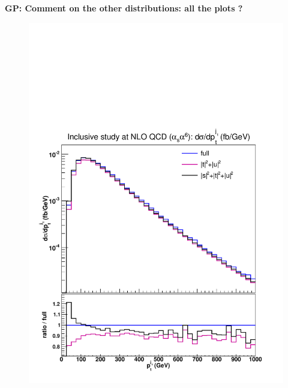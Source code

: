 {\bf GP: Comment on the other distributions: all the plots ?}
\begin{figure}[hbt]
\centering
{\includegraphics[scale=0.35]{figures/scanfigures/ptj1_nlo.pdf}}

\end{figure}
